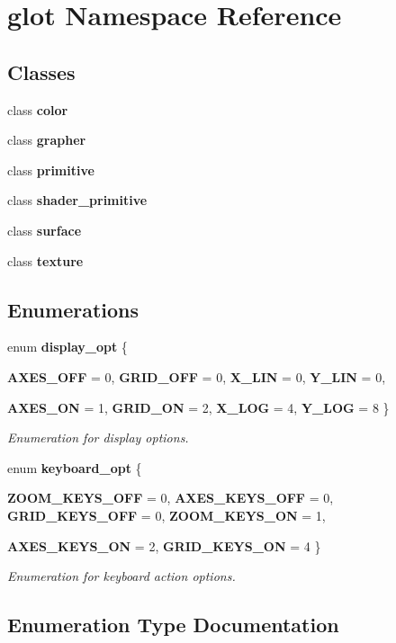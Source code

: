 \section{glot Namespace Reference}
\label{namespaceglot}
\subsection*{Classes}
\begin{CompactItemize}
\item 
class {\bf color}
\item 
class {\bf grapher}
\item 
class {\bf primitive}
\item 
class {\bf shader\_\-primitive}
\item 
class {\bf surface}
\item 
class {\bf texture}
\end{CompactItemize}
\subsection*{Enumerations}
\begin{CompactItemize}
\item 
enum {\bf display\_\-opt} \{ \par
{\bf AXES\_\-OFF} =  0, 
{\bf GRID\_\-OFF} =  0, 
{\bf X\_\-LIN} =  0, 
{\bf Y\_\-LIN} =  0, 
\par
{\bf AXES\_\-ON} =  1, 
{\bf GRID\_\-ON} =  2, 
{\bf X\_\-LOG} =  4, 
{\bf Y\_\-LOG} =  8
 \}
\begin{CompactList}\small\item\em Enumeration for display options. \item\end{CompactList}\item 
enum {\bf keyboard\_\-opt} \{ \par
{\bf ZOOM\_\-KEYS\_\-OFF} =  0, 
{\bf AXES\_\-KEYS\_\-OFF} =  0, 
{\bf GRID\_\-KEYS\_\-OFF} =  0, 
{\bf ZOOM\_\-KEYS\_\-ON} =  1, 
\par
{\bf AXES\_\-KEYS\_\-ON} =  2, 
{\bf GRID\_\-KEYS\_\-ON} =  4
 \}
\begin{CompactList}\small\item\em Enumeration for keyboard action options. \item\end{CompactList}\end{CompactItemize}


\subsection{Enumeration Type Documentation}
